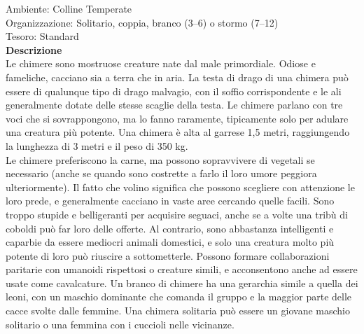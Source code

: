 \begin{multicols}{2}
Ambiente: Colline Temperate\\
Organizzazione: Solitario, coppia, branco (3–6) o stormo (7–12)\\
Tesoro: Standard\\
\textbf{Descrizione}\\
Le chimere sono mostruose creature nate dal male primordiale. Odiose e fameliche, cacciano sia a terra che in aria. La testa di drago di una chimera può essere di qualunque tipo di drago malvagio, con il soffio corrispondente e le ali generalmente dotate delle stesse scaglie della testa. Le chimere parlano con tre voci che si sovrappongono, ma lo fanno raramente, tipicamente solo per adulare una creatura più potente. Una chimera è alta al garrese 1,5 metri, raggiungendo la lunghezza di 3 metri e il peso di 350 kg.\\
Le chimere preferiscono la carne, ma possono sopravvivere di vegetali se necessario (anche se quando sono costrette a farlo il loro umore peggiora ulteriormente). Il fatto che volino significa che possono scegliere con attenzione le loro prede, e generalmente cacciano in vaste aree cercando quelle facili. Sono troppo stupide e belligeranti per acquisire seguaci, anche se a volte una tribù di coboldi può far loro delle offerte. Al contrario, sono abbastanza intelligenti e caparbie da essere mediocri animali domestici, e solo una creatura molto più potente di loro può riuscire a sottometterle. Possono formare collaborazioni paritarie con umanoidi rispettosi o creature simili, e acconsentono anche ad essere usate come cavalcature. Un branco di chimere ha una gerarchia simile a quella dei leoni, con un maschio dominante che comanda il gruppo e la maggior parte delle cacce svolte dalle femmine. Una chimera solitaria può essere un giovane maschio solitario o una femmina con i cuccioli nelle vicinanze.\\


\end{multicols}
